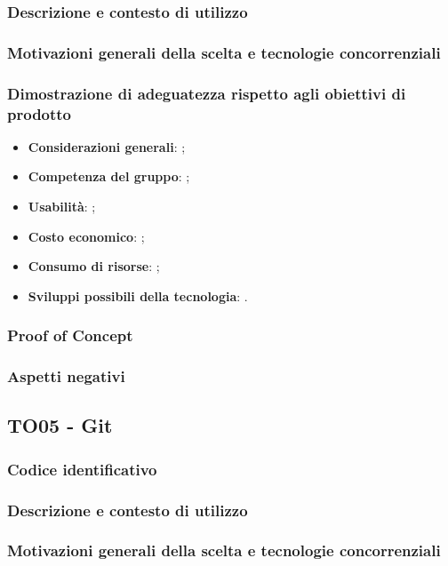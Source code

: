 \documentclass[./../Technology Baseline.tex]{subfiles}
\begin{document}
\subsubsection{Descrizione e contesto di utilizzo}
\subsubsection{Motivazioni generali della scelta e tecnologie concorrenziali}
\subsubsection{Dimostrazione di adeguatezza rispetto agli obiettivi di prodotto}
\begin{itemize}
	\item \textbf{Considerazioni generali}: ;
	\item \textbf{Competenza del gruppo}: ;
	\item \textbf{Usabilità}: ;
	\item \textbf{Costo economico}: ;
	\item \textbf{Consumo di risorse}: ;
	\item \textbf{Sviluppi possibili della tecnologia}: .
\end{itemize}
\subsubsection{Proof of Concept}
\subsubsection{Aspetti negativi}

\subsection{TO05 - Git}

\subsubsection{Codice identificativo}
\subsubsection{Descrizione e contesto di utilizzo}
\subsubsection{Motivazioni generali della scelta e tecnologie concorrenziali}
\end{document}
